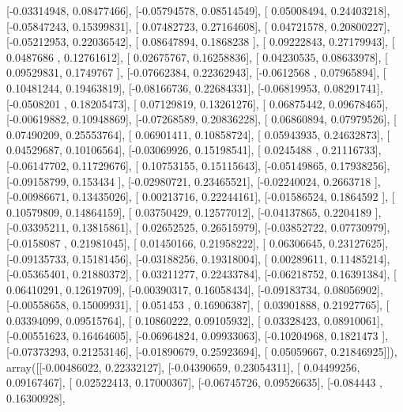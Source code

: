 \documentclass{article}
\begin{document}
       [-0.03314948,  0.08477466],
       [-0.05794578,  0.08514549],
       [ 0.05008494,  0.24403218],
       [-0.05847243,  0.15399831],
       [ 0.07482723,  0.27164608],
       [ 0.04721578,  0.20800227],
       [-0.05212953,  0.22036542],
       [ 0.08647894,  0.1868238 ],
       [ 0.09222843,  0.27179943],
       [ 0.0487686 ,  0.12761612],
       [ 0.02675767,  0.16258836],
       [ 0.04230535,  0.08633978],
       [ 0.09529831,  0.1749767 ],
       [-0.07662384,  0.22362943],
       [-0.0612568 ,  0.07965894],
       [ 0.10481244,  0.19463819],
       [-0.08166736,  0.22684331],
       [-0.06819953,  0.08291741],
       [-0.0508201 ,  0.18205473],
       [ 0.07129819,  0.13261276],
       [ 0.06875442,  0.09678465],
       [-0.00619882,  0.10948869],
       [-0.07268589,  0.20836228],
       [ 0.06860894,  0.07979526],
       [ 0.07490209,  0.25553764],
       [ 0.06901411,  0.10858724],
       [ 0.05943935,  0.24632873],
       [ 0.04529687,  0.10106564],
       [-0.03069926,  0.15198541],
       [ 0.0245488 ,  0.21116733],
       [-0.06147702,  0.11729676],
       [ 0.10753155,  0.15115643],
       [-0.05149865,  0.17938256],
       [-0.09158799,  0.153434  ],
       [-0.02980721,  0.23465521],
       [-0.02240024,  0.2663718 ],
       [-0.00986671,  0.13435026],
       [ 0.00213716,  0.22244161],
       [-0.01586524,  0.1864592 ],
       [ 0.10579809,  0.14864159],
       [ 0.03750429,  0.12577012],
       [-0.04137865,  0.2204189 ],
       [-0.03395211,  0.13815861],
       [ 0.02652525,  0.26515979],
       [-0.03852722,  0.07730979],
       [-0.0158087 ,  0.21981045],
       [ 0.01450166,  0.21958222],
       [ 0.06306645,  0.23127625],
       [-0.09135733,  0.15181456],
       [-0.03188256,  0.19318004],
       [ 0.00289611,  0.11485214],
       [-0.05365401,  0.21880372],
       [ 0.03211277,  0.22433784],
       [-0.06218752,  0.16391384],
       [ 0.06410291,  0.12619709],
       [-0.00390317,  0.16058434],
       [-0.09183734,  0.08056902],
       [-0.00558658,  0.15009931],
       [ 0.051453  ,  0.16906387],
       [ 0.03901888,  0.21927765],
       [ 0.03394099,  0.09515764],
       [ 0.10860222,  0.09105932],
       [ 0.03328423,  0.08910061],
       [-0.00551623,  0.16464605],
       [-0.06964824,  0.09933063],
       [-0.10204968,  0.1821473 ],
       [-0.07373293,  0.21253146],
       [-0.01890679,  0.25923694],
       [ 0.05059667,  0.21846925]]), array([[-0.00486022,  0.22332127],
       [-0.04390659,  0.23054311],
       [ 0.04499256,  0.09167467],
       [ 0.02522413,  0.17000367],
       [-0.06745726,  0.09526635],
       [-0.084443  ,  0.16300928],
\end{document}
